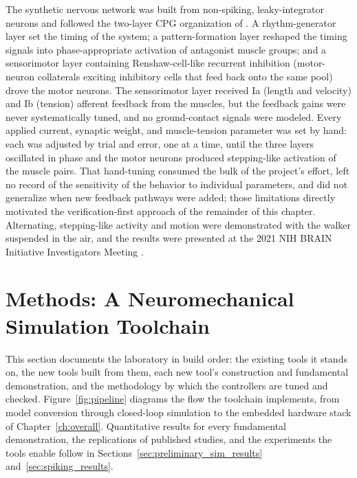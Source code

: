 The synthetic nervous network was built from non-spiking, leaky-integrator neurons and followed the two-layer CPG organization of \citet{deng_neuromechanical_2019}. A rhythm-generator layer set the timing of the system; a pattern-formation layer reshaped the timing signals into phase-appropriate activation of antagonist muscle groups; and a sensorimotor layer containing Renshaw-cell-like recurrent inhibition (motor-neuron collaterals exciting inhibitory cells that feed back onto the same pool) drove the motor neurons. The sensorimotor layer received Ia (length and velocity) and Ib (tension) afferent feedback from the muscles, but the feedback gains were never systematically tuned, and no ground-contact signals were modeled. Every applied current, synaptic weight, and muscle-tension parameter was set by hand: each was adjusted by trial and error, one at a time, until the three layers oscillated in phase and the motor neurons produced stepping-like activation of the muscle pairs. That hand-tuning consumed the bulk of the project's effort, left no record of the sensitivity of the behavior to individual parameters, and did not generalize when new feedback pathways were added; those limitations directly motivated the verification-first approach of the remainder of this chapter. Alternating, stepping-like activity and motion were demonstrated with the walker suspended in the air, and the results were presented at the 2021 NIH BRAIN Initiative Investigators Meeting \citep{bolenTorqueValuesArtificialKnee2021June15-17}.

\section{Methods: A Neuromechanical Simulation Toolchain}\label{sec:preliminary_sim_methods}

This section documents the laboratory in build order: the existing tools it stands on, the new tools built from them, each new tool's construction and fundamental demonstration, and the methodology by which the controllers are tuned and checked. Figure~\ref{fig:pipeline} diagrams the flow the toolchain implements, from model conversion through closed-loop simulation to the embedded hardware stack of Chapter~\ref{ch:overall}. Quantitative results for every fundamental demonstration, the replications of published studies, and the experiments the tools enable follow in Sections~\ref{sec:preliminary_sim_results} and~\ref{sec:spiking_results}.

